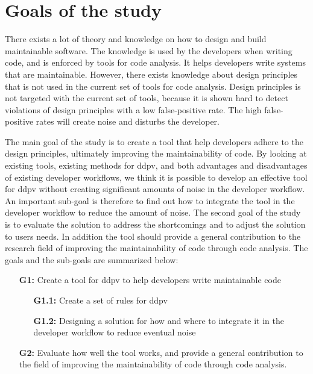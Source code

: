 \documentclass{report}
\begin{document}
\section{Goals of the study}

There exists a lot of theory and knowledge on how to design and build maintainable software. The knowledge is used by the developers when writing code, and is enforced by tools for code analysis. It helps developers write systems that are maintainable. However, there exists knowledge about design principles that is not used in the current set of tools for code analysis. Design principles is not targeted with the current set of tools, because it is shown hard to detect violations of design principles with a low false-positive rate. The high false-positive rates will create noise and disturbs the developer.

The main goal of the study is to create a tool that help developers adhere to the design principles, ultimately improving the maintainability of code. By looking at existing tools, existing methods for \gls{ddpv}, and both advantages and disadvantages of existing developer workflows, we think it is possible to develop an effective tool for \gls{ddpv} without creating significant amounts of noise in the developer workflow. An important sub-goal is therefore to find out how to integrate the tool in the developer workflow to reduce the amount of noise. The second goal of the study is to evaluate the solution to address the shortcomings and to adjust the solution to users needs. In addition the tool should provide a general contribution to the research field of improving the maintainability of code through code analysis. The goals and the sub-goals are summarized below:

\begin{enumerate}
    \item [\textbf{G1:}] Create a tool for \gls{ddpv} to help developers write maintainable code
    \begin{enumerate}
        \item [\textbf{G1.1:}] Create a set of rules for \gls{ddpv}
        \item [\textbf{G1.2:}]Designing a solution for how and where to integrate it in the developer workflow to reduce eventual noise
    \end{enumerate}
    \item [\textbf{G2:}] Evaluate how well the tool works, and provide a general contribution to the field of improving the maintainability of code through code analysis.  
\end{enumerate}
\end{document}
